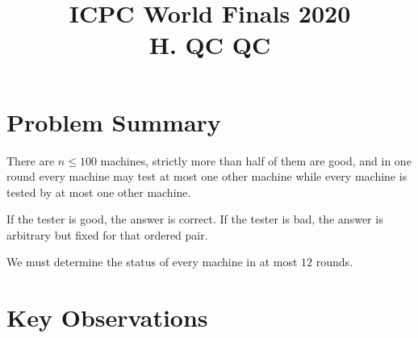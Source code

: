 \documentclass[11pt]{article}
\title{ICPC World Finals 2020\\H. QC QC}
\author{}
\date{}
\begin{document}
\maketitle

\section*{Problem Summary}

There are $n \le 100$ machines, strictly more than half of them are good, and in one round every machine may test at most one other machine while every machine is tested by at most one other machine.

If the tester is good, the answer is correct. If the tester is bad, the answer is arbitrary but fixed for that ordered pair.

We must determine the status of every machine in at most $12$ rounds.

\section*{Key Observations}
\end{document}
